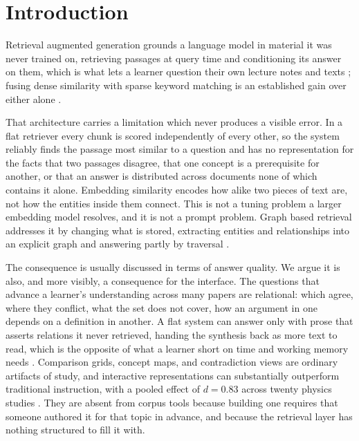 \documentclass[conference]{IEEEtran}
\begin{document}
\section{Introduction}

Retrieval augmented generation grounds a language model in material it was never trained on, retrieving passages at query time and conditioning its answer on them, which is what lets a learner question their own lecture notes and texts \cite{ref:gao}; fusing dense similarity with sparse keyword matching is an established gain over either alone \cite{ref:hybridrag}.

That architecture carries a limitation which never produces a visible error. In a flat retriever every chunk is scored independently of every other, so the system reliably finds the passage most similar to a question and has no representation for the facts that two passages disagree, that one concept is a prerequisite for another, or that an answer is distributed across documents none of which contains it alone. Embedding similarity encodes how alike two pieces of text are, not how the entities inside them connect. This is not a tuning problem a larger embedding model resolves, and it is not a prompt problem. Graph based retrieval addresses it by changing what is stored, extracting entities and relationships into an explicit graph and answering partly by traversal \cite{ref:edge}.

The consequence is usually discussed in terms of answer quality. We argue it is also, and more visibly, a consequence for the interface. The questions that advance a learner's understanding across many papers are relational: which agree, where they conflict, what the set does not cover, how an argument in one depends on a definition in another. A flat system can answer only with prose that asserts relations it never retrieved, handing the synthesis back as more text to read, which is the opposite of what a learner short on time and working memory needs \cite{ref:mayer}. Comparison grids, concept maps, and contradiction views are ordinary artifacts of study, and interactive representations can substantially outperform traditional instruction, with a pooled effect of $d = 0.83$ across twenty physics studies \cite{ref:phetmeta}. They are absent from corpus tools because building one requires that someone authored it for that topic in advance, and because the retrieval layer has nothing structured to fill it with.
\end{document}
